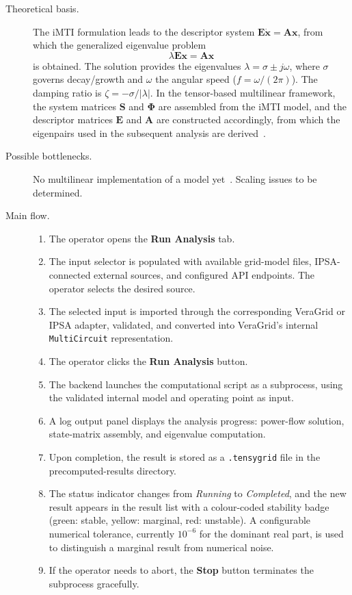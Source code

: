 \begin{description}
  \item[Theoretical basis.] The iMTI formulation leads to the descriptor system $\mathbf{E}\dot{\mathbf{x}}=\mathbf{A}\mathbf{x}$, from which the generalized eigenvalue problem
        \[
          \lambda\mathbf{E}\mathbf{x}=\mathbf{A}\mathbf{x}
        \]
        is obtained. The solution provides the eigenvalues $\lambda=\sigma\pm j\omega$, where $\sigma$ governs decay/growth and $\omega$ the angular speed ($f=\omega/(2\pi)$). The damping ratio is $\zeta=-\sigma/\lvert\lambda\rvert$. In the tensor-based multilinear framework, the system matrices $\mathbf{S}$ and $\mathbf{\Phi}$ are assembled from the iMTI model, and the descriptor matrices $\mathbf{E}$ and $\mathbf{A}$ are constructed accordingly, from which the eigenpairs used in the subsequent analysis are derived~\cite{Kaufmann2025TenSyGridD11}.
  \item[Possible bottlenecks.] No multilinear implementation of a model yet~\cite{deJuanVela2026TenSyGridD33}. Scaling issues to be determined.
  \item[Main flow.]
        \begin{enumerate}[before=\leavevmode, leftmargin=*]
          \item The operator opens the \textbf{Run Analysis} tab.
          \item The input selector is populated with available grid-model files, IPSA-connected external sources, and configured API endpoints. The operator selects the desired source.
          \item The selected input is imported through the corresponding VeraGrid or IPSA adapter, validated, and converted into VeraGrid's internal \texttt{MultiCircuit} representation.
          \item The operator clicks the \textbf{Run Analysis} button.
          \item The backend launches the computational script as a subprocess, using the validated internal model and operating point as input.
          \item A log output panel displays the analysis progress: power-flow solution, state-matrix assembly, and eigenvalue computation.
          \item Upon completion, the result is stored as a \texttt{.tensygrid} file in the precomputed-results directory.
          \item The status indicator changes from \textit{Running} to \textit{Completed}, and the new result appears in the result list with a colour-coded stability badge (green: stable, yellow: marginal, red: unstable). A configurable numerical tolerance, currently $10^{-6}$ for the dominant real part, is used to distinguish a marginal result from numerical noise.
          \item If the operator needs to abort, the \textbf{Stop} button terminates the subprocess gracefully.
        \end{enumerate}


\end{description}
